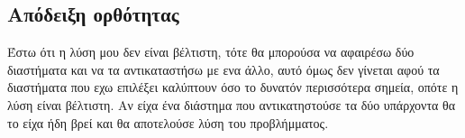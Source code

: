 \documentclass[12pt]{article}
\begin{document}
\subsection{Απόδειξη ορθότητας}
Έστω ότι η λύση μου δεν είναι βέλτιστη, τότε θα μπορούσα να αφαιρέσω δύο διαστήματα και να τα αντικαταστήσω με ενα άλλο, αυτό όμως δεν γίνεται αφού τα διαστήματα που εχω επιλέξει καλύπτουν όσο το δυνατόν περισσότερα σημεία, οπότε η λύση είναι βέλτιστη. Αν είχα ένα διάστημα που αντικατηστούσε τα δύο υπάρχοντα θα το είχα ήδη βρεί και θα αποτελούσε λύση του προβλήμματος.
\end{document}
